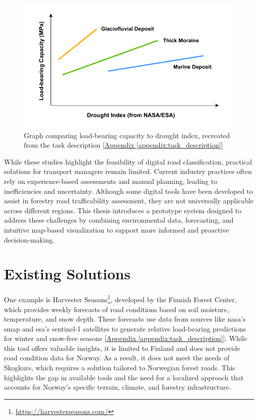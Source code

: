 \begin{figure}[h]
    \centering
    \includegraphics[width=0.7\linewidth]{figures/bæreevne_tørkeindex.pdf}
    \caption[Graph comparing load-bearing capacity to drought index]{Graph comparing load-bearing capacity to drought index, recreated from the task description [\hyperref[appendix:task_description]{Appendix \ref*{appendix:task_description}}]}
    \label{fig:load_to_drought_graph}
\end{figure}

While these studies highlight the feasibility of digital road classification, practical solutions for transport managers remain limited. Current industry practices often rely on experience-based assessments and manual planning, leading to inefficiencies and uncertainty. Although some digital tools have been developed to assist in forestry road trafficability assessment, they are not universally applicable across different regions. This thesis introduces a prototype system designed to address these challenges by combining environmental data, forecasting, and intuitive map-based visualization to support more informed and proactive decision-making.

\section{Existing Solutions}

One example is Harvester Seasons\footnote{\url{https://harvesterseasons.com/}}, developed by the Finnish Forest Center, which provides weekly forecasts of road conditions based on soil moisture, temperature, and snow depth. These forecasts use data from sources like \acrshort{nasa}'s \gls{smap} and \acrshort{esa}'s \Gls{sentinel-1} satellites to generate relative load-bearing predictions for winter and snow-free seasons [\hyperref[appendix:task_description]{Appendix \ref*{appendix:task_description}}]. While this tool offers valuable insights, it is limited to Finland and does not provide road condition data for Norway. As a result, it does not meet the needs of Skogkurs, which requires a solution tailored to Norwegian forest roads. This highlights the gap in available tools and the need for a localized approach that accounts for Norway's specific terrain, climate, and forestry infrastructure.

